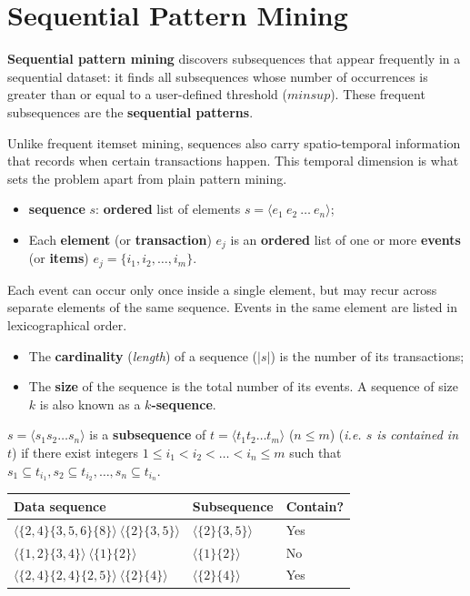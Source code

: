 \section{Sequential Pattern Mining}

\textbf{Sequential pattern mining} discovers subsequences that appear frequently in a sequential dataset: it finds all subsequences whose number of occurrences is greater than or equal to a user-defined threshold ($minsup$). These frequent subsequences are the \textbf{sequential patterns}.

Unlike frequent itemset mining, sequences also carry spatio-temporal information that records when certain transactions happen. This temporal dimension is what sets the problem apart from plain pattern mining.
\begin{itemize}
    \item \textbf{sequence} $s$: \textbf{ordered} list of elements $s = \langle e_1~ e_2~ \ldots~ e_n\rangle$;
    \item Each \textbf{element} (or \textbf{transaction}) $e_j$ is an \textbf{ordered} list of one or more \textbf{events} (or \textbf{items}) $e_j = \{ i_1, i_2, \ldots , i_m \}$.
\end{itemize}

Each event can occur only once inside a single element, but may recur across separate elements of the same sequence. Events in the same element are listed in lexicographical order.
\begin{itemize}
    \item The \textbf{cardinality} (\textit{length}) of a sequence ($|s|$) is the number of its transactions;
    \item The \textbf{size} of the sequence is the total number of its events. A sequence of size $k$ is also known as a \textbf{$k$-sequence}.
\end{itemize}


$s = \langle s_1 s_2 \ldots s_n\rangle$ is a \textbf{subsequence} of $t = \langle t_1 t_2 \dots t_m\rangle$ ($n\leq m$) (\textit{i.e. $s$ is contained in $t$}) if there exist integers $1 \leq i_1 < i_2 < \dots < i_n \leq m$ such that $s_1 \subseteq t_{i_1}, s_2 \subseteq t_{i_2}, \dots , s_n \subseteq t_{i_n}$. 
\begin{table}[h]
\centering
\begin{tabular}{p{5cm}|p{2.5cm}|p{2.5cm}}
\toprule
\textbf{Data sequence} & \textbf{Subsequence} & \textbf{Contain?} \\
\midrule
$\langle \{2,4\} \{3,5,6\} \{8\} \rangle ~\langle \{2\} \{3,5\} \rangle$ & $\langle \{2\} \{3,5\} \rangle$ & Yes \\
\hline
$\langle \{1,2\} \{3,4\} \rangle~ \langle \{1\} \{2\} \rangle$ & $\langle \{1\} \{2\} \rangle$ & No \\
\hline
$\langle \{2,4\} \{2,4\} \{2,5\} \rangle ~ \langle \{2\} \{4\} \rangle$ & $\langle \{2\} \{4\} \rangle$ & Yes \\
\bottomrule
\end{tabular}
\end{table}

